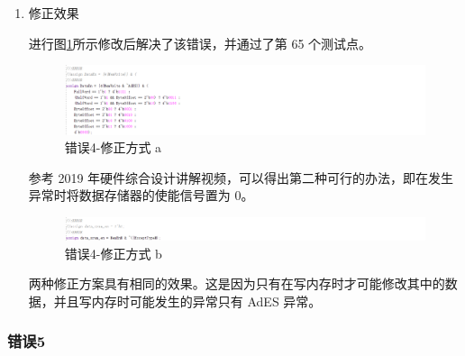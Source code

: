 \begin{enumerate}[(1)]
    \item 修正效果

进行图\ref{fig:错误4-修正效果1}所示修改后解决了该错误，并通过了第 65 个测试点。

\begin{figure}[H]
    \centering
    \includegraphics[width=\textwidth]{image/错误4-修正效果1.png}
    \caption{错误4-修正方式 a}
    \label{fig:错误4-修正效果1}
\end{figure}

参考 2019 年硬件综合设计讲解视频，可以得出第二种可行的办法，即在发生异常时将数据存储器的使能信号置为 0。

\begin{figure}[H]
    \centering
    \includegraphics[width=\textwidth]{image/错误4-修正效果2.png}
    \caption{错误4-修正方式 b}
    \label{fig:错误4-修正效果2}
\end{figure}

两种修正方案具有相同的效果。这是因为只有在写内存时才可能修改其中的数据，并且写内存时可能发生的异常只有 AdES 异常。

\end{enumerate}


\subsubsection{错误5}

